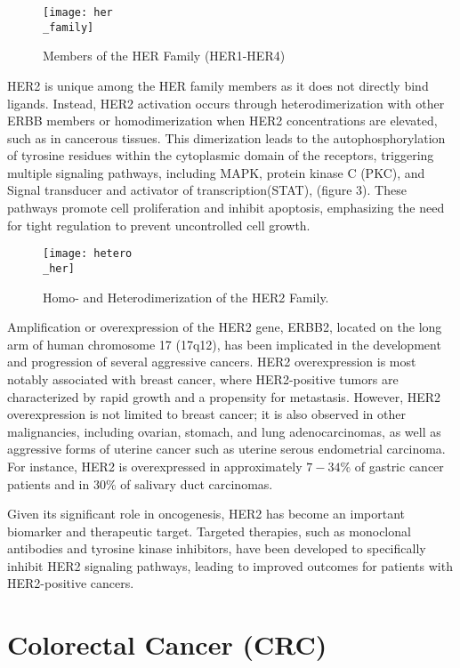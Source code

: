 \documentclass[12pt]{article}
\begin{document}
\begin{figure}[h]
\centering
\texttt{[image: her\\\_family]}
\caption{Members of the HER Family (HER1-HER4)}
\end{figure}


HER2 is unique among the HER family members as it does not directly bind ligands. Instead, HER2 activation occurs through heterodimerization with other ERBB members or homodimerization when HER2 concentrations are elevated, such as in cancerous tissues. This dimerization leads to the autophosphorylation of tyrosine residues within the cytoplasmic domain of the receptors, triggering multiple signaling pathways, including MAPK, protein kinase C (PKC), and Signal transducer and activator of transcription(STAT), (figure 3). These pathways promote cell proliferation and inhibit apoptosis, emphasizing the need for tight regulation to prevent uncontrolled cell growth.

\begin{figure}[h]
\centering
\texttt{[image: hetero\\\_her]}
\caption{Homo- and Heterodimerization of the HER2 Family.}
\end{figure}

Amplification or overexpression of the HER2 gene, ERBB2, located on the long arm of human chromosome 17 (17q12), has been implicated in the development and progression of several aggressive cancers. HER2 overexpression is most notably associated with breast cancer, where HER2-positive tumors are characterized by rapid growth and a propensity for metastasis. However, HER2 overexpression is not limited to breast cancer; it is also observed in other malignancies, including ovarian, stomach, and lung adenocarcinomas, as well as aggressive forms of uterine cancer such as uterine serous endometrial carcinoma. For instance, HER2 is overexpressed in approximately $7-34\%$ of gastric cancer patients and in $30\%$ of salivary duct carcinomas.

Given its significant role in oncogenesis, HER2 has become an important biomarker and therapeutic target. Targeted therapies, such as monoclonal antibodies and tyrosine kinase inhibitors, have been developed to specifically inhibit HER2 signaling pathways, leading to improved outcomes for patients with HER2-positive cancers.

\section{Colorectal Cancer (CRC)}
\end{document}
